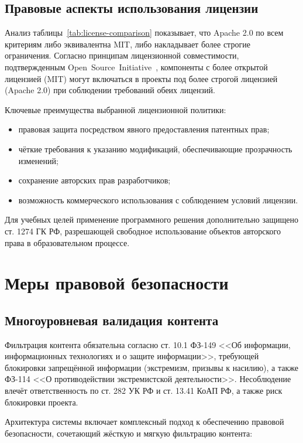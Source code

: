 \subsection{Правовые аспекты использования лицензии}

Анализ таблицы~\ref{tab:license-comparison} показывает, что Apache 2.0 по всем критериям либо эквивалентна MIT, либо накладывает более строгие ограничения. Согласно принципам лицензионной совместимости, подтвержденным \mbox{Open Source Initiative \cite{osi}}, компоненты с более открытой лицензией (MIT) могут включаться в проекты под более строгой лицензией (Apache 2.0) при соблюдении требований обеих лицензий.

Ключевые преимущества выбранной лицензионной политики:

\begin{itemize}
	\item правовая защита посредством явного предоставления патентных прав;
	\item чёткие требования к указанию модификаций, обеспечивающие прозрачность изменений;
	\item сохранение авторских прав разработчиков;
	\item возможность коммерческого использования с соблюдением условий лицензии.
\end{itemize}

Для учебных целей применение программного решения дополнительно защищено ст. 1274 ГК РФ, разрешающей свободное использование объектов авторского права в образовательном процессе.

\section{Меры правовой безопасности}

\subsection{Многоуровневая валидация контента}
Фильтрация контента обязательна согласно ст. 10.1 ФЗ-149 <<Об информации, информационных технологиях и о защите информации>>, требующей блокировки запрещённой информации (экстремизм, призывы к насилию), а также ФЗ-114 <<О противодействии экстремистской деятельности>>. Несоблюдение влечёт ответственность по ст. 282 УК РФ и ст. 13.41 КоАП РФ, а также риск блокировки проекта.

Архитектура системы включает комплексный подход к обеспечению правовой безопасности, сочетающий жёсткую и мягкую фильтрацию контента:

